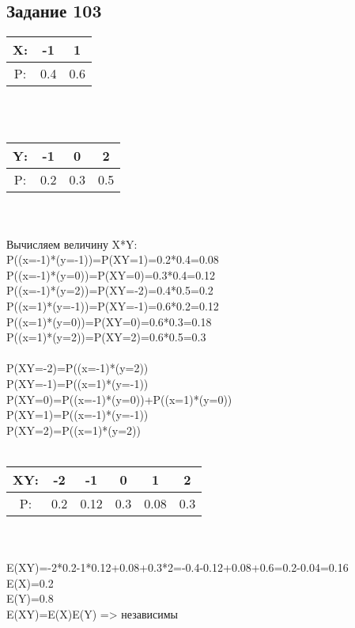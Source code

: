 \documentclass[12pt]{article}
\begin{document}
\subsection{Задание 103}
\begin{tabular}{|c|c|c|}
\hline
X: & -1 & 1  \\
\hline
P: & 0.4 & 0.6  \\
\hline
\end{tabular}
\\
\\
\begin{tabular}{|c|c|c|c|}
\hline
Y: & -1 & 0 & 2  \\
\hline
P: & 0.2 & 0.3 & 0.5  \\
\hline
\end{tabular}
\\
\\
Вычисляем величину X*Y:\\
P((x=-1)*(y=-1))=P(XY=1)=0.2*0.4=0.08\\
P((x=-1)*(y=0))=P(XY=0)=0.3*0.4=0.12\\
P((x=-1)*(y=2))=P(XY=-2)=0.4*0.5=0.2\\
P((x=1)*(y=-1))=P(XY=-1)=0.6*0.2=0.12\\
P((x=1)*(y=0))=P(XY=0)=0.6*0.3=0.18\\
P((x=1)*(y=2))=P(XY=2)=0.6*0.5=0.3\\
\\
P(XY=-2)=P((x=-1)*(y=2))\\
P(XY=-1)=P((x=1)*(y=-1))\\
P(XY=0)=P((x=-1)*(y=0))+P((x=1)*(y=0))\\
P(XY=1)=P((x=-1)*(y=-1))\\
P(XY=2)=P((x=1)*(y=2))\\
\\
\begin{tabular}{|c|c|c|c|c|c|}
\hline
XY: & -2 & -1 & 0 & 1 & 2  \\
\hline
P: & 0.2 & 0.12 & 0.3 & 0.08 & 0.3  \\
\hline
\end{tabular}
\\
\\
E(XY)=-2*0.2-1*0.12+0.08+0.3*2=-0.4-0.12+0.08+0.6=0.2-0.04=0.16\\
E(X)=0.2\\
E(Y)=0.8\\
E(XY)=E(X)E(Y) => независимы\\

\newpage
\end{document}
